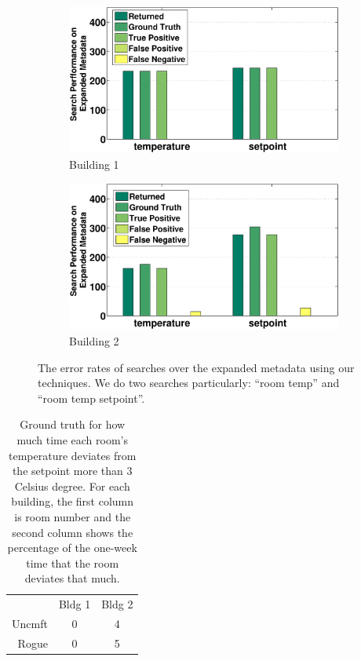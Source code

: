 \begin{figure}[h!]
\centering
	\begin{subfigure}{0.48\textwidth}
                \centering
		\includegraphics[width=\textwidth]{./figs/50-soda.eps}
                \caption{Building 1}
	\end{subfigure}
	\begin{subfigure}{0.48\textwidth}
                \centering
		\includegraphics[width=\textwidth]{./figs/50-sdh.eps}
                \caption{Building 2}
	\end{subfigure}
\caption{The error rates of searches over the expanded metadata using our techniques. We do two searches particularly: ``room temp'' and ``room temp setpoint''.}
\label{fig:error}
\end{figure}

\begin{table}[ht!]
 \begin{center}
\begin{tabular}{rcc}
\multicolumn{1}{l}{} & Bldg 1                 & Bldg 2                  \\ \cline{2-3} 
Uncmft               & \multicolumn{1}{|c}{0} & \multicolumn{1}{|c|}{4} \\ \cline{2-3} 
Rogue                & \multicolumn{1}{|c}{0} & \multicolumn{1}{|c|}{5} \\ \cline{2-3} 
\end{tabular}
 \end{center}
 \caption{Ground truth for how much time each room's temperature deviates from the setpoint more than 3 Celsius degree. For each building, the first column is room number and the second column shows the percentage of the one-week time that the room deviates that much.}
 \label{tab:cluster}
\end{table}